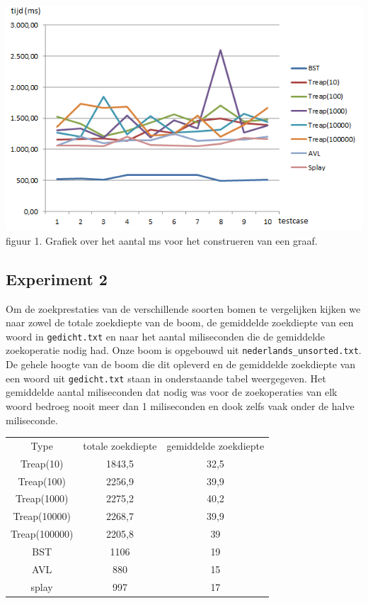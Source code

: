 \documentclass[a4paper,10pt]{article}
\begin{document}
\begin{center}
\includegraphics[scale=0.75]{fill.png}
figuur 1. Grafiek over het aantal ms voor het construeren van een graaf.
\end{center}

\subsection{Experiment 2}
Om de zoekprestaties van de verschillende soorten bomen te vergelijken kijken we naar zowel de totale zoekdiepte van de boom, de gemiddelde zoekdiepte van een woord in \texttt{gedicht.txt} en naar het aantal miliseconden die de gemiddelde zoekoperatie nodig had. Onze boom is opgebouwd uit \texttt{nederlands\_unsorted.txt}.
De gehele hoogte van de boom die dit opleverd en de gemiddelde zoekdiepte van een woord uit \texttt{gedicht.txt} staan in onderstaande tabel weergegeven. Het gemiddelde aantal miliseconden dat nodig was voor de zoekoperaties van elk woord bedroeg nooit meer dan 1 miliseconden en dook zelfs vaak onder de halve miliseconde.

\begin{center}
\begin{tabular}{c c c}
Type & totale zoekdiepte & gemiddelde zoekdiepte \\
Treap(10) & 1843,5 & 32,5 \\
Treap(100) & 2256,9 & 39,9 \\
Treap(1000) & 2275,2 & 40,2 \\
Treap(10000) & 2268,7 & 39,9 \\
Treap(100000) & 2205,8 & 39 \\
BST & 1106 & 19 \\
AVL & 880 & 15 \\
splay & 997 & 17 \\
\end{tabular}
\end{center}
\end{document}
